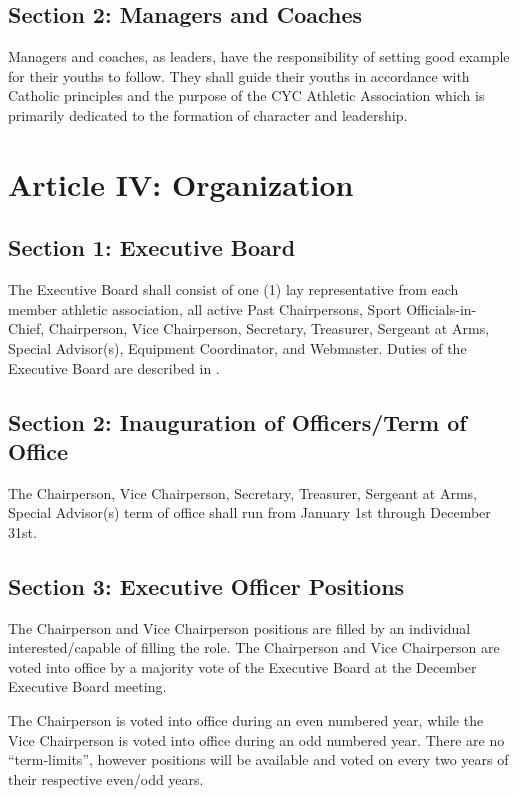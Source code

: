 \subsection{Section 2: Managers and Coaches}
\label{ssec:const-3-2}
Managers and coaches, as leaders, have the responsibility of setting good example for their youths to follow.  They  shall guide their youths in accordance with Catholic principles and the purpose of the CYC Athletic Association  which is primarily dedicated to the formation of character and leadership.

\section{Article IV: Organization}
\label{sec:const-4]}
\subsection{Section 1: Executive Board}
\label{ssec:const-4-1}
The Executive Board shall consist of one (1) lay representative from each member athletic association, all active Past Chairpersons, Sport Officials-in-Chief, Chairperson, Vice Chairperson, Secretary, Treasurer, Sergeant at Arms, Special Advisor(s), Equipment Coordinator, and Webmaster.  Duties of the Executive Board are described in .

\subsection{Section 2: Inauguration of Officers/Term of Office}
\label{ssec:const-4-2}
The Chairperson, Vice Chairperson, Secretary, Treasurer, Sergeant at Arms, Special Advisor(s) term of office shall run from January 1st through December 31st.  

\subsection{Section 3: Executive Officer Positions}
\label{ssec:const-4-3}
The Chairperson and Vice Chairperson positions are filled by an individual interested/capable of filling the role. The Chairperson and Vice Chairperson are voted into office by a majority vote of the Executive Board at the December Executive Board meeting.

The Chairperson is voted into office during an even numbered year, while the Vice Chairperson is voted into office during an odd numbered year. There are no “term-limits”, however positions will be available and voted on every two years of their respective even/odd years.

